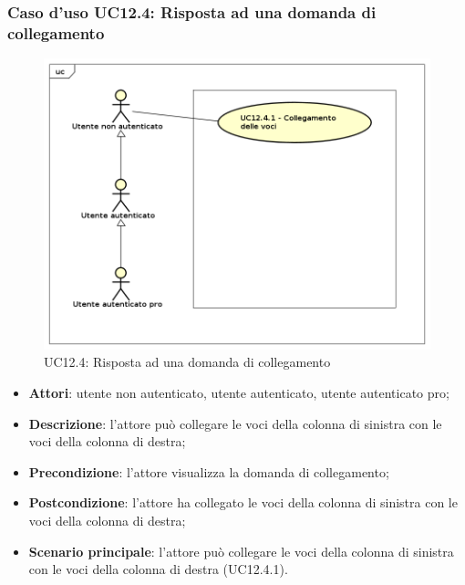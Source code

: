 \subsubsection{Caso d'uso UC12.4: Risposta ad una domanda di collegamento}
\begin{figure}[h]
	\centering
	\includegraphics[scale=0.5]{UML/UC12_4.png}
	\caption{UC12.4: Risposta ad una domanda di collegamento}
\end{figure}
\begin{itemize}
\item \textbf{Attori}: utente non autenticato, utente autenticato, utente autenticato pro;
\item \textbf{Descrizione}: l'attore può collegare le voci della colonna di sinistra con le voci della colonna di destra;
\item \textbf{Precondizione}: l'attore visualizza la domanda di collegamento;
\item \textbf{Postcondizione}: l'attore ha collegato le voci della colonna di sinistra con le voci della colonna di destra;
\item \textbf{Scenario principale}: l'attore può collegare le voci della colonna di sinistra con le voci della colonna di destra (UC12.4.1).
\end{itemize}

\newpage
